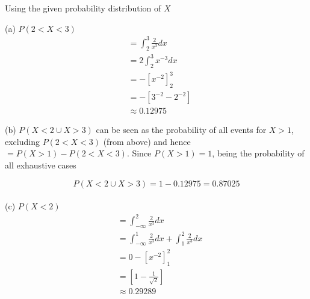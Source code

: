 \documentclass[boxes, qed]{homework}
\begin{document}
\newenvironment{amatrix}[1]{%
  \left[\begin{array}{@{}*{#1}{c}|c@{}}
}{%
  \end{array}\right]
}

\newenvironment{augmatrix}[1]{%
  \left[\begin{array}{#1}
}{%
  \end{array}\right]
}

\begin{problem}Using the given probability distribution of $X$
\end{problem}
\begin{solution}(a) $P(2 < X < 3)$
  \begin{align*}
    &= \int_{2}^{3}{\frac{2}{x^3}}dx\\
    &= 2\int_{2}^{3}{x^{-3}}dx\\
    &= -\left[ x^{-2} \right]_{2}^{3}\\
    &= -\left[ 3^{-2} - 2^{-2} \right]\\
    &\approx \boxed{0.12975}
  \end{align*}

  (b) $P(X < 2 \cup X > 3)$ can be seen as the probability
    of all events for $X>1$, excluding $P(2 < X < 3)$ (from above)
    and hence $= P(X > 1) - P(2 < X < 3)$.
    Since $P(X > 1)=1$, being the probability of all exhaustive cases

    $$P(X < 2 \cup X > 3) = 1-0.12975 = \boxed{0.87025}$$\\

  (c) $P(X < 2)$
  \begin{align*}
    &= \int_{-\infty}^{2}{\frac{2}{x^3}}dx\\
    &= \int_{-\infty}^{1}{\frac{2}{x^3}}dx + \int_{1}^{2}{\frac{2}{x^3}}dx\\
    &= 0 -\left[ x^{-2} \right]_{1}^{2}\\
    &= \left[ 1-\frac{1}{\sqrt{2}} \right]\\
    &\approx \boxed{0.29289}
  \end{align*}
\end{solution}
\end{document}
